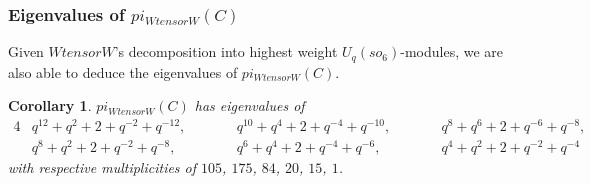 \documentclass[10pt,a4paper]{amsart}
\numberwithin{equation}{section}
\newtheorem{Corollary}[Theorem]{Corollary}
\theoremstyle{definition}
\def\boldsymbol#1{#1}
\def\mathcal#1{#1}
\def\mathfrak#1{#1}
\def\pi{pi}
\def\otimes{ tensor }
\begin{document}
\subsubsection[Eigenvalues of pi\_\{W otimes W\}(C)]{Eigenvalues of $\boldsymbol{\pi_{W \otimes W}(C)}$}
Given $W \otimes W$'s decomposition into highest weight $\mathcal{U}_q(\mathfrak{so}_6)$-modules, we are also able to deduce the eigenvalues of $\pi_{W \otimes W}(C)$.
\begin{Corollary}
 $\pi_{W \otimes W}(C)$ has eigenvalues of
 \begin{alignat*}{4}
 & q^{12}+q^2+2+q^{-2}+q^{-12}, \qquad&&
 q^{10}+q^4 + 2 + q^{-4}+q^{-10}, \qquad&&
 q^8 +q^6+2+q^{-6}+q^{-8},& \\
& q^8+q^2+2+q^{-2}+q^{-8}, \qquad&&
 q^6 + q^4 +2 + q^{-4}+q^{-6}, \qquad&&
 q^4+q^2+2+q^{-2}+q^{-4}&
 \end{alignat*}
 with respective multiplicities of $105$, $175$, $84$, $20$, $15$, $1$.
\end{Corollary}
\end{document}
